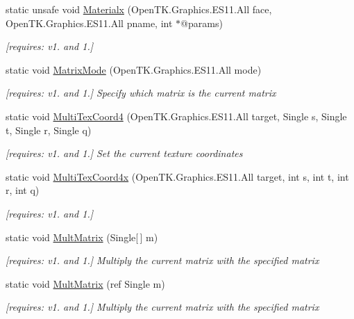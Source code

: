 \begin{DoxyCompactItemize}
static unsafe void \hyperlink{class_open_t_k_1_1_graphics_1_1_e_s11_1_1_g_l_ac7bcc7d59d10d9fb830d8c2c7984b701}{Materialx} (Open\-T\-K.\-Graphics.\-E\-S11.\-All face, Open\-T\-K.\-Graphics.\-E\-S11.\-All pname, int $\ast$@params)
\begin{DoxyCompactList}\small\item\em \mbox{[}requires\-: v1. and 1.\mbox{]}\end{DoxyCompactList}\item 
static void \hyperlink{class_open_t_k_1_1_graphics_1_1_e_s11_1_1_g_l_ad6f94a0792e8ea8e6e1842368d7d1e1a}{Matrix\-Mode} (Open\-T\-K.\-Graphics.\-E\-S11.\-All mode)
\begin{DoxyCompactList}\small\item\em \mbox{[}requires\-: v1. and 1.\mbox{]} Specify which matrix is the current matrix \end{DoxyCompactList}\item 
static void \hyperlink{class_open_t_k_1_1_graphics_1_1_e_s11_1_1_g_l_a23c3727db75a86ebbcb48a7c1c9b05aa}{Multi\-Tex\-Coord4} (Open\-T\-K.\-Graphics.\-E\-S11.\-All target, Single s, Single t, Single r, Single q)
\begin{DoxyCompactList}\small\item\em \mbox{[}requires\-: v1. and 1.\mbox{]} Set the current texture coordinates \end{DoxyCompactList}\item 
static void \hyperlink{class_open_t_k_1_1_graphics_1_1_e_s11_1_1_g_l_a165628307603c04c4d00132b683088c2}{Multi\-Tex\-Coord4x} (Open\-T\-K.\-Graphics.\-E\-S11.\-All target, int s, int t, int r, int q)
\begin{DoxyCompactList}\small\item\em \mbox{[}requires\-: v1. and 1.\mbox{]}\end{DoxyCompactList}\item 
static void \hyperlink{class_open_t_k_1_1_graphics_1_1_e_s11_1_1_g_l_a48b7fc43c35b61f9213f4aedba5f9017}{Mult\-Matrix} (Single\mbox{[}$\,$\mbox{]} m)
\begin{DoxyCompactList}\small\item\em \mbox{[}requires\-: v1. and 1.\mbox{]} Multiply the current matrix with the specified matrix \end{DoxyCompactList}\item 
static void \hyperlink{class_open_t_k_1_1_graphics_1_1_e_s11_1_1_g_l_a5528acf048f0fc4e135accbd45cfc971}{Mult\-Matrix} (ref Single m)
\begin{DoxyCompactList}\small\item\em \mbox{[}requires\-: v1. and 1.\mbox{]} Multiply the current matrix with the specified matrix \end{DoxyCompactList}\item 

\end{DoxyCompactItemize}
